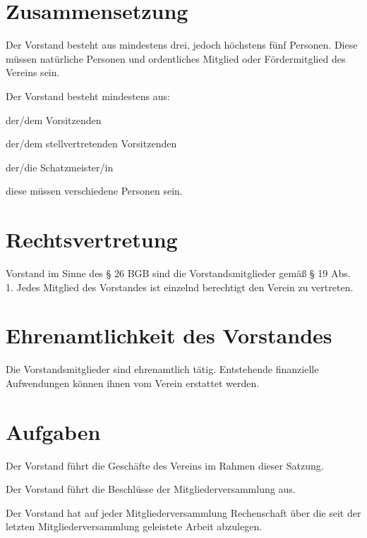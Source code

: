 \section{Zusammensetzung}
	\begin{myEnum}
		\item Der Vorstand besteht aus mindestens drei, jedoch höchstens fünf Personen. Diese müssen natürliche Personen und ordentliches Mitglied oder Fördermitglied des Vereins sein.
		\item Der Vorstand besteht mindestens aus:
			\begin{mySubEnum}
				\item der/dem Vorsitzenden
				\item der/dem stellvertretenden Vorsitzenden
				\item der/die Schatzmeister/in
			\end{mySubEnum}
		diese müssen verschiedene Personen sein.
	\end{myEnum}
	
\section{Rechtsvertretung}
	Vorstand im Sinne des § 26 BGB sind die Vorstandsmitglieder gemäß § 19 Abs. 1. Jedes Mitglied des Vorstandes ist einzelnd berechtigt den Verein zu vertreten.

\section{Ehrenamtlichkeit des Vorstandes}
	Die Vorstandsmitglieder sind ehrenamtlich tätig. Entstehende finanzielle Aufwendungen können ihnen vom Verein erstattet werden.
	
\section{Aufgaben}
	\begin{myEnum}
		\item Der Vorstand führt die Geschäfte des Vereins im Rahmen dieser Satzung.
		\item Der Vorstand führt die Beschlüsse der Mitgliederversammlung aus.
		\item Der Vorstand hat auf jeder Mitgliederversammlung Rechenschaft über die seit der letzten Mitgliederversammlung geleistete Arbeit abzulegen.
	\end{myEnum}

